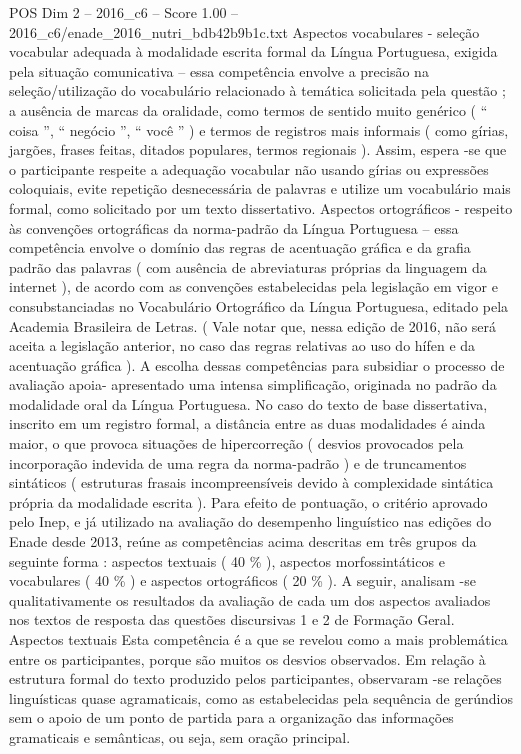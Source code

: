 \begin{textsample}{POS Dim 2 – 2016\_c6 – Score 1.00 – 2016\_c6/enade\_2016\_nutri\_bdb42b9b1c.txt}
Aspectos vocabulares - seleção vocabular adequada à modalidade escrita formal da Língua Portuguesa, exigida pela situação comunicativa – essa competência envolve a precisão na seleção/utilização do vocabulário relacionado à temática solicitada pela questão ; a ausência de marcas da oralidade, como termos de sentido muito genérico ( “ coisa ”, “ negócio ”, “ você ” ) e termos de registros mais informais ( como gírias, jargões, frases feitas, ditados populares, termos regionais ).
Assim, espera -se que o participante respeite a adequação vocabular não usando gírias ou expressões coloquiais, evite repetição desnecessária de palavras e utilize um vocabulário mais formal, como solicitado por um texto dissertativo.
Aspectos ortográficos - respeito às convenções ortográficas da norma-padrão da Língua Portuguesa – essa competência envolve o domínio das regras de acentuação gráfica e da grafia padrão das palavras ( com ausência de abreviaturas próprias da linguagem da internet ), de acordo com as convenções estabelecidas pela legislação em vigor e consubstanciadas no Vocabulário Ortográfico da Língua Portuguesa, editado pela Academia Brasileira de Letras. ( Vale notar que, nessa edição de 2016, não será aceita a legislação anterior, no caso das regras relativas ao uso do hífen e da acentuação gráfica ).
A escolha dessas competências para subsidiar o processo de avaliação apoia- apresentado uma intensa simplificação, originada no padrão da modalidade oral da Língua Portuguesa.
No caso do texto de base dissertativa, inscrito em um registro formal, a distância entre as duas modalidades é ainda maior, o que provoca situações de hipercorreção ( desvios provocados pela incorporação indevida de uma regra da norma-padrão ) e de truncamentos sintáticos ( estruturas frasais incompreensíveis devido à complexidade sintática própria da modalidade escrita ).
Para efeito de pontuação, o critério aprovado pelo Inep, e já utilizado na avaliação do desempenho linguístico nas edições do Enade desde 2013, reúne as competências acima descritas em três grupos da seguinte forma : aspectos textuais ( 40 \% ), aspectos morfossintáticos e vocabulares ( 40 \% ) e aspectos ortográficos ( 20 \% ).
A seguir, analisam -se qualitativamente os resultados da avaliação de cada um dos aspectos avaliados nos textos de resposta das questões discursivas 1 e 2 de Formação Geral.
Aspectos textuais Esta competência é a que se revelou como a mais problemática entre os participantes, porque são muitos os desvios observados.
Em relação à estrutura formal do texto produzido pelos participantes, observaram -se relações linguísticas quase agramaticais, como as estabelecidas pela sequência de gerúndios sem o apoio de um ponto de partida para a organização das informações gramaticais e semânticas, ou seja, sem oração principal.

\end{textsample}
